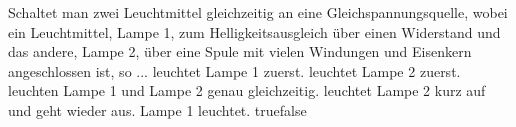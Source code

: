     {Schaltet man zwei Leuchtmittel gleichzeitig an eine Gleichspannungsquelle, wobei ein Leuchtmittel, Lampe 1, zum Helligkeitsausgleich über einen Widerstand und das andere, Lampe 2, über eine Spule mit vielen Windungen und Eisenkern angeschlossen ist, so ...}
    {leuchtet Lampe 1 zuerst.}
    {leuchtet Lampe 2 zuerst.}
    {leuchten Lampe 1 und Lampe 2 genau gleichzeitig.}
    {leuchtet Lampe 2 kurz auf und geht wieder aus. Lampe 1 leuchtet.}
    {true}{false}